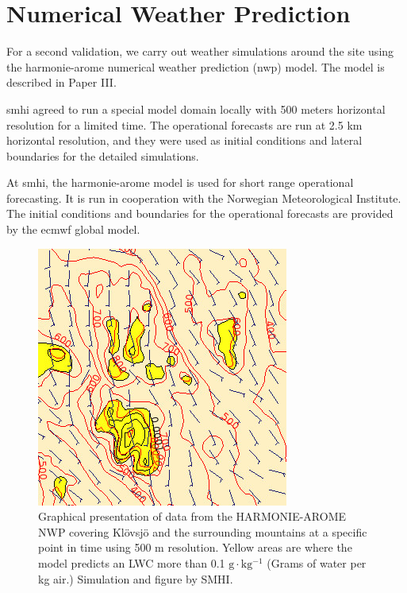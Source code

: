 \section{Numerical Weather Prediction}

For a second validation, we carry out weather simulations around the site using the \gls{harmonie}-\gls{arome} numerical weather prediction (\gls{nwp}) model. The model is described in Paper III.

\gls{smhi} agreed to run a special model domain locally with 500 meters horizontal resolution for a limited time. The operational forecasts are run at 2.5 km horizontal resolution, and they were used as initial conditions and lateral boundaries for the detailed simulations.

At \gls{smhi}, the \gls{harmonie}-\gls{arome} model is used for short range operational forecasting. It is run in cooperation with the Norwegian Meteorological Institute. The initial conditions and boundaries for the operational forecasts are provided by the \gls{ecmwf} global model.

\begin{figure}%
\centering\includegraphics[width=0.6\linewidth]{figures/Images/Klovsjo_smhi160923_small}
\caption{Graphical presentation of data from the HARMONIE-AROME NWP covering Klövsjö and the surrounding mountains at a specific point in time using 500 m resolution. Yellow areas are where the model predicts an LWC more than 0.1 $\mathrm{g \cdot kg^{-1}}$ (Grams of water per kg air.) Simulation and figure by SMHI.}
\end{figure}



